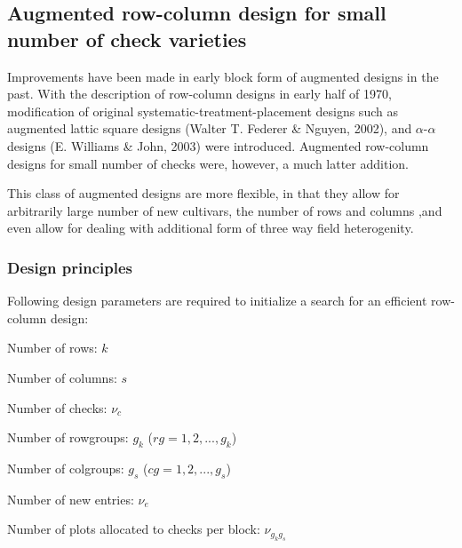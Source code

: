 \documentclass[12pt,oneside]{dukestatscithesis} %
\theoremstyle{definition}
\theoremstyle{definition}
\theoremstyle{definition}
\theoremstyle{remark}
\begin{document}
\subsection{Augmented row-column design for small number of check
varieties}\label{aug-row-col-des}

Improvements have been made in early block form of augmented designs in
the past. With the description of row-column designs in early half of
1970, modification of original systematic-treatment-placement designs
such as augmented lattic square designs (Walter T. Federer \& Nguyen,
2002), and \(\alpha\)-\(\alpha\) designs (E. Williams \& John, 2003)
were introduced. Augmented row-column designs for small number of checks
were, however, a much latter addition.

This class of augmented designs are more flexible, in that they allow
for arbitrarily large number of new cultivars, the number of rows and
columns ,and even allow for dealing with additional form of three way
field heterogenity.

\subsubsection{Design principles}\label{des-prin-aug-row-col}

Following design parameters are required to initialize a search for an
efficient row-column design:

Number of rows: \(k\)

Number of columns: \(s\)

Number of checks: \(\nu_c\)

Number of rowgroups: \(g_k\) (\(rg = 1, 2, ..., g_k\))

Number of colgroups: \(g_s\) (\(cg = 1, 2, ..., g_s\))

Number of new entries: \(\nu_e\)

Number of plots allocated to checks per block: \(\nu_{g_{k}g_{s}}\)
\end{document}
